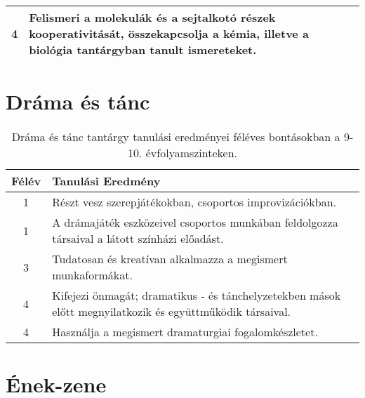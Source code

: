 \begin{longtable}{c | p{12cm} }
                                
                                          4 &  Felismeri a molekulák és a sejtalkotó részek kooperativitását, összekapcsolja  a kémia, illetve a biológia tantárgyban tanult ismereteket. \\ \hline
                                      
                        \end{longtable}
            \clearpage

        \section{Dráma és tánc}

       
           \begin{longtable}{c | p{12cm} }
            \caption[Dráma és tánc 9-10.]{Dráma és tánc tantárgy tanulási eredményei féléves bontásokban a 9-10. évfolyamszinteken. }  \\

            \textbf{Félév} & \textbf{Tanulási Eredmény} \\
            \hline
            \endhead
                                
                                          1 &  Részt vesz szerepjátékokban, csoportos improvizációkban. \\ \hline
                                          1 &  A drámajáték eszközeivel csoportos munkában feldolgozza társaival a látott színházi előadást. \\ \hline
                                      
                                
                                          3 &  Tudatosan és kreatívan alkalmazza a megismert munkaformákat. \\ \hline
                                      
                                
                                          4 &  Kifejezi önmagát; dramatikus - és tánchelyzetekben mások előtt megnyilatkozik és együttműködik társaival. \\ \hline
                                          4 &  Használja a megismert dramaturgiai fogalomkészletet. \\ \hline
                                      
                        \end{longtable}
            \clearpage

        \section{Ének-zene}


